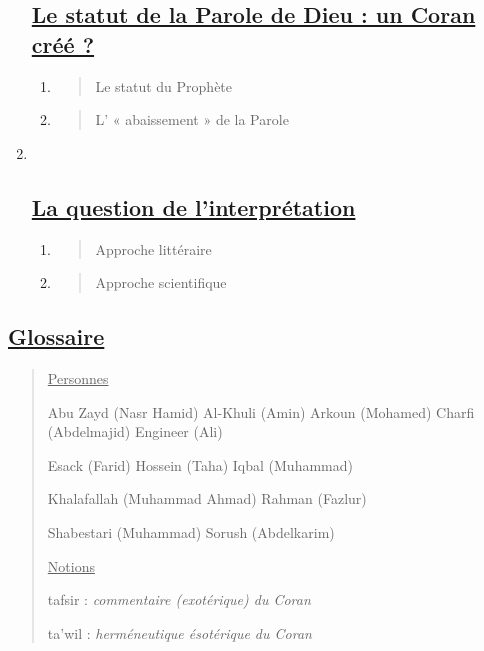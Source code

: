\begin{enumerate}
{  \subsection{\texorpdfstring{\underline{Le statut de la Parole de Dieu
  : un Coran créé
  ?}}{Le statut de la Parole de Dieu : un Coran créé ?}}\label{le-statut-de-la-parole-de-dieu-un-coran-cruxe9uxe9}}

  \begin{enumerate}
  \def\labelenumii{\arabic{enumii}.}
  \item
    \begin{quote}
    Le statut du Prophète
    \end{quote}
  \item
    \begin{quote}
    L' « abaissement » de la Parole
    \end{quote}
  \end{enumerate}
\item ~
  \hypertarget{la-question-de-linterpruxe9tation}{%
  \subsection{\texorpdfstring{\underline{La question de
  l'interprétation}}{La question de l'interprétation}}\label{la-question-de-linterpruxe9tation}}

  \begin{enumerate}
  \def\labelenumii{\arabic{enumii}.}
  \item
    \begin{quote}
    Approche littéraire
    \end{quote}
  \item
    \begin{quote}
    Approche scientifique
    \end{quote}
  \end{enumerate}
\end{enumerate}

\hypertarget{glossaire-7}{%
\subsection{\texorpdfstring{\underline{Glossaire}}{Glossaire}}\label{glossaire-7}}

\begin{quote}
\underline{Personnes}

Abu Zayd (Nasr Hamid) Al-Khuli (Amin) Arkoun (Mohamed) Charfi
(Abdelmajid) Engineer (Ali)

Esack (Farid) Hossein (Taha) Iqbal (Muhammad)

Khalafallah (Muhammad Ahmad) Rahman (Fazlur)

Shabestari (Muhammad) Sorush (Abdelkarim)

\underline{Notions}

tafsir : \emph{commentaire (exotérique) du Coran}

ta'wil : \emph{herméneutique ésotérique du Coran}
\end{quote}

